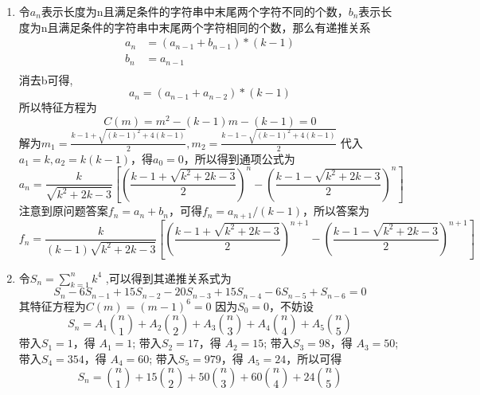 \documentclass[a4paper]{article}
\begin{document}
\begin{enumerate}[]
\item 
\begin{solution}
    令$a_n$表示长度为n且满足条件的字符串中末尾两个字符不同的个数，$b_n$表示长度为n且满足条件的字符串中末尾两个字符相同的个数，那么有递推关系
    \begin{align*}
        a_n &= (a_{n-1}+b_{n-1}) * (k-1) \\
        b_n &= a_{n-1} \\
    \end{align*}
    消去b可得, 
    \begin{equation*}
        a_n = (a_{n-1} + a_{n-2}) * (k-1)
    \end{equation*}
    所以特征方程为
    \begin{equation*}
        C(m) = m^2-(k-1)m-(k-1) = 0
    \end{equation*}
    解为$m_1 = \frac{k-1+\sqrt{(k-1)^2+4(k-1)}}{2}, m_2 = \frac{k-1-\sqrt{(k-1)^2+4(k-1)}}{2}$
    代入$a_1=k,a_2=k(k-1)$，得$a_0=0$，所以得到通项公式为
    \begin{equation*}
        a_n = \frac{k}{\sqrt{k^2+2k-3}} [ (\frac{k-1+\sqrt{k^2+2k-3}}{2}) ^ n - (\frac{k-1-\sqrt{k^2+2k-3}}{2}) ^n ]
    \end{equation*}
    注意到原问题答案$f_n=a_n+b_n$，可得$f_n = a_{n+1}/(k-1)$，所以答案为
    \begin{equation*}
        f_n = \frac{k}{(k-1)\sqrt{k^2+2k-3}} [ (\frac{k-1+\sqrt{k^2+2k-3}}{2}) ^ {n+1} - (\frac{k-1-\sqrt{k^2+2k-3}}{2}) ^{n+1} ]
    \end{equation*}
    
\end{solution}

\item 
\begin{solution}
    令$S_n= \sum _{k=1} ^ {n} k^4$ ,可以得到其递推关系式为
    \begin{equation*}
        S_{n} - 6S_{n-1} + 15S_{n-2} - 20S_{n-3} + 15S_{n-4} - 6S_{n-5} + S_{n-6} = 0
    \end{equation*}
    其特征方程为$C(m) = (m-1)^6 = 0$
    因为$S_0=0$，不妨设
    \begin{equation*}
        S_n = A_1 \binom{n}{1} + A_2 \binom{n}{2} + A_3 \binom{n}{3} + A_4 \binom{n}{4} + A_5 \binom{n}{5}
    \end{equation*}
    带入$S_1 = 1$，得 $A_1 = 1$; 带入$S_2 = 17$，得 $A_2 = 15$; 带入$S_3 = 98$，得 $A_3 = 50$; 带入$S_4 = 354$，得 $A_4 = 60$; 
    带入$S_5 = 979$，得 $A_5 = 24$，所以可得
    \begin{equation*}
        S_n = \binom{n}{1} + 15 \binom{n}{2} + 50 \binom{n}{3} + 60 \binom{n}{4} + 24 \binom{n}{5}
    \end{equation*}
\end{solution}


\end{enumerate}
\end{document}
